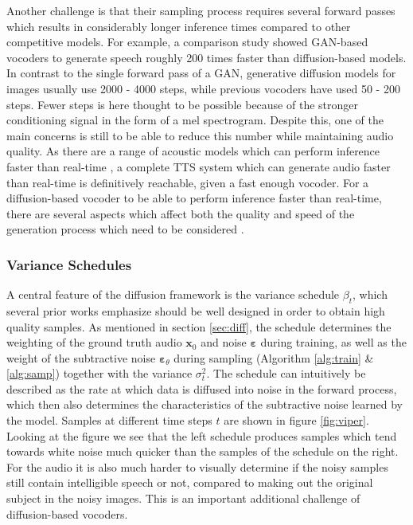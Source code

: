 \documentclass{report}
\begin{document}
Another challenge is that their sampling process requires several forward passes which results in considerably longer inference times compared to other competitive models. For example, a comparison study showed GAN-based vocoders to generate speech roughly 200 times faster than diffusion-based models. In contrast to the single forward pass of a GAN, generative diffusion models for images usually use 2000 - 4000 steps, while previous vocoders have used 50 - 200 steps. Fewer steps is here thought to be possible because of the stronger conditioning signal in the form of a mel spectrogram. Despite this, one of the main concerns is still to be able to reduce this number while maintaining audio quality. As there are a range of acoustic models which can perform inference faster than real-time \cite{ren2020fastspeech, luo2021lightspeech}, a complete TTS system which can generate audio faster than real-time is definitively reachable, given a fast enough vocoder. For a diffusion-based vocoder to be able to perform inference faster than real-time, there are several aspects which affect both the quality and speed of the generation process which need to be considered \cite{albadawy2022vocbench}. 

\subsubsection{Variance Schedules}
A central feature of the diffusion framework is the variance schedule $\beta_t$, which several prior works emphasize should be well designed in order to obtain high quality samples. As mentioned in section \ref{sec:diff}, the schedule determines the weighting of the ground truth audio $\bm{x}_0$ and noise $\bm{\varepsilon}$ during training, as well as the weight of the subtractive noise $\bm{\varepsilon}_{\theta}$ during sampling (Algorithm \ref{alg:train} \& \ref{alg:samp}) together with the variance $\sigma_t^2$. The schedule can intuitively be described as the rate at which data is diffused into noise in the forward process, which then also determines the characteristics of the subtractive noise learned by the model. Samples at different time steps $t$ are shown in figure \ref{fig:viper}. Looking at the figure we see that the left schedule produces samples which tend towards white noise much quicker than the samples of the schedule on the right. For the audio it is also much harder to visually determine if the noisy samples still contain intelligible speech or not, compared to making out the original subject in the noisy images. This is an important additional challenge of diffusion-based vocoders.
\end{document}
